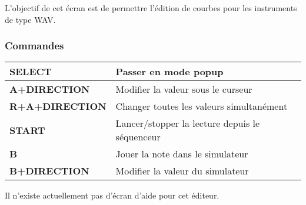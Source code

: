 \label{subsec:customwave}

L'objectif de cet écran est de permettre l'édition de courbes pour les instruments de type WAV.



\subsubsection{Commandes}
\tablelasttail{\hline}
\begin{supertabular}{|l|p{11cm}|}
    \hline
    {\bf SELECT} & Passer en mode popup \\
    \hline
    {\bf A+DIRECTION} & Modifier la valeur sous le curseur \\
    \hline
    {\bf R+A+DIRECTION} & Changer toutes les valeurs simultanément \\
    \hline
    {\bf START} & Lancer/stopper la lecture depuis le séquenceur \\
    \hline
    {\bf B} & Jouer la note dans le simulateur \\
    \hline
    {\bf B+DIRECTION} & Modifier la valeur du simulateur \\
\end{supertabular} \medskip

Il n'existe actuellement pas d'écran d'aide pour cet éditeur.

